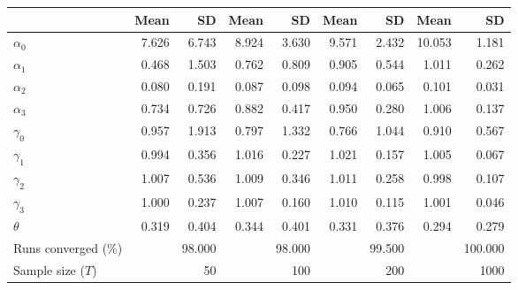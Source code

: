 
\begin{tabular}[t]{lrrrrrrrr}
\toprule
  & Mean & SD & Mean  & SD  & Mean   & SD   & Mean    & SD   \\
\midrule
$\alpha_{0}$ & 7.626 & 6.743 & 8.924 & 3.630 & 9.571 & 2.432 & 10.053 & 1.181\\
$\alpha_{1}$ & 0.468 & 1.503 & 0.762 & 0.809 & 0.905 & 0.544 & 1.011 & 0.262\\
$\alpha_{2}$ & 0.080 & 0.191 & 0.087 & 0.098 & 0.094 & 0.065 & 0.101 & 0.031\\
$\alpha_{3}$ & 0.734 & 0.726 & 0.882 & 0.417 & 0.950 & 0.280 & 1.006 & 0.137\\
$\gamma_{0}$ & 0.957 & 1.913 & 0.797 & 1.332 & 0.766 & 1.044 & 0.910 & 0.567\\
$\gamma_{1}$ & 0.994 & 0.356 & 1.016 & 0.227 & 1.021 & 0.157 & 1.005 & 0.067\\
$\gamma_{2}$ & 1.007 & 0.536 & 1.009 & 0.346 & 1.011 & 0.258 & 0.998 & 0.107\\
$\gamma_{3}$ & 1.000 & 0.237 & 1.007 & 0.160 & 1.010 & 0.115 & 1.001 & 0.046\\
$\theta$ & 0.319 & 0.404 & 0.344 & 0.401 & 0.331 & 0.376 & 0.294 & 0.279\\
Runs converged (\%) &  & 98.000 &  & 98.000 &  & 99.500 &  & 100.000\\
Sample size ($T$) &  & 50 &  & 100 &  & 200 &  & 1000\\
\bottomrule
\end{tabular}
